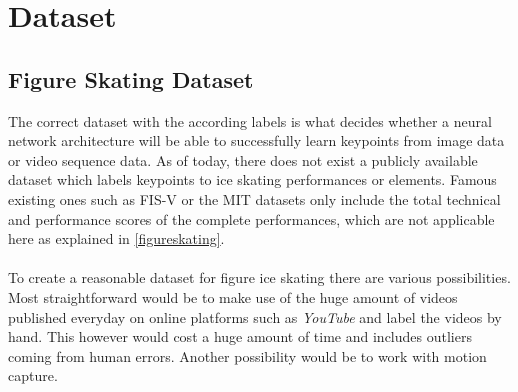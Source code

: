 

\chapter{Dataset} %

\label{dataset} %



\section{Figure Skating Dataset}

The correct dataset with the according labels is what decides whether a neural network architecture will be able
to successfully learn keypoints from image data or video sequence data.
As of today, there does not exist a publicly available dataset which labels keypoints to ice skating performances or
elements.
Famous existing ones such as FIS-V or the MIT datasets only include the total technical and performance scores of the
complete performances, which are not applicable here as explained in \autoref{figureskating}.
\\\mbox{}\\
To create a reasonable dataset for figure ice skating there are various possibilities.
Most straightforward would be to make use of the huge amount of videos published everyday on online platforms such as
\textit{YouTube} and label the videos by hand. This however would cost a huge amount of time and includes outliers coming from
human errors.
Another possibility would be to work with motion capture.
\\\mbox{}\\


